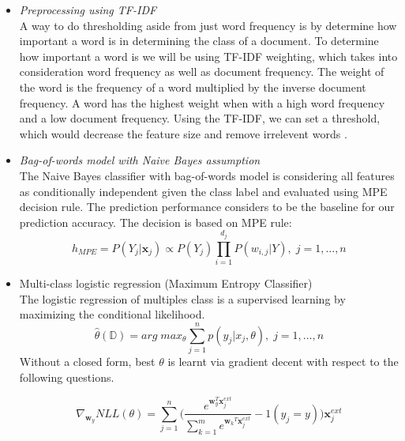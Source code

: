 \documentclass[10pt,twocolumn,letterpaper]{article}
\begin{document}
\begin{itemize}
	\item \textit{ Preprocessing using TF-IDF} \\
	A way to do thresholding aside from just word frequency is by determine how important a word is in determining the class of a document. To determine how important a word is we will be using TF-IDF  weighting, which takes into consideration word frequency as well as document frequency. The weight of the word is the frequency of a word multiplied by the inverse document frequency. A word has the highest weight when with a high word frequency and a low document frequency. Using the TF-IDF, we can set a threshold, which would decrease the feature size and remove irrelevent words \cite{schutze2008introduction}.
	
	\item \textit{Bag-of-words model with Naive Bayes assumption}\\
	The Naive Bayes classifier with bag-of-words model is considering all features as conditionally independent given the class label and evaluated using MPE decision rule.\cite{ishwarspring18} The prediction performance considers to be the baseline for our prediction accuracy. 
	The decision is based on MPE rule:
	\[h_{MPE} = P(Y_j|\pmb{x}_j) \propto P(Y_j)\prod^{d_j}_{i=1}P(w_{i,j}|Y), \;j = 1,\ldots,n\]
	\item Multi-class logistic regression (Maximum Entropy Classifier) \\
	The logistic regression of multiples class is a supervised learning by maximizing the conditional likelihood.
	\[\hat{\theta}(\mathbb{D}) = arg \; max_\theta \sum_{j=1}^{n}p(y_j|x_j,\theta), \;j = 1,\ldots,n\]Without a closed form, best $\theta$ is learnt via gradient decent with respect to the following questions. 
	
	\[\nabla_{\pmb{w}_y}NLL(\theta) = \sum_{j=1}^{n}\bigg(\frac{e^{\pmb{w}_y^T\pmb{x}_j^{ext}}}{\sum_{k=1}^{m}e^{{\pmb{w}_k}^T\pmb{x}_j^{ext}}}-1(y_j = y)\bigg)\pmb{x}^{ext}_{j}\]
	

\end{itemize}
\end{document}
